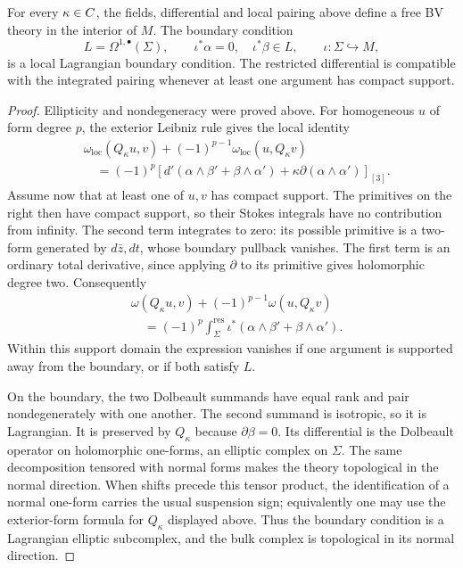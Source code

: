 \begin{proposition}
\label{prop:bf-bv-family}
For every $\kappa\in C$, the fields, differential and local pairing above
define a free BV theory in the interior of $M$.  The boundary condition
\[
 L=\Omega^{1,\bullet}(\Sigma),\qquad
 \iota^*\alpha=0,\quad \iota^*\beta\in L,
 \qquad \iota:\Sigma\hookrightarrow M,
\]
is a local Lagrangian boundary condition.  The restricted differential
is compatible with the integrated pairing whenever at least one
argument has compact support.
\end{proposition}
\begin{proof}
Ellipticity and nondegeneracy were proved above.  For homogeneous $u$
of form degree $p$, the exterior Leibniz rule gives the local identity
\[
 \begin{split}
 &\omega_{\mathrm{loc}}(Q_\kappa u,v)
              +(-1)^{p-1}\omega_{\mathrm{loc}}(u,Q_\kappa v)\\
 &\quad=(-1)^p\left[d'(\alpha\wedge\beta'+\beta\wedge\alpha')
                  +\kappa\partial(\alpha\wedge\alpha')\right]_{[3]}.
 \end{split}
\]
Assume now that at least one of $u,v$ has compact support.  The
primitives on the right then have compact support, so their Stokes
integrals have no contribution from infinity.  The second term
integrates to zero: its possible primitive is a two-form generated
by $d\bar z,dt$, whose boundary pullback vanishes.  The first term is
an ordinary total derivative, since applying $\partial$ to its
primitive gives holomorphic degree two.  Consequently
\[
 \begin{split}
 &\omega(Q_\kappa u,v)+(-1)^{p-1}\omega(u,Q_\kappa v)\\
 &\quad=(-1)^p\int_\Sigma^{\mathrm{res}}
    \iota^*(\alpha\wedge\beta'+\beta\wedge\alpha').
 \end{split}
\]
Within this support domain the expression vanishes if one argument
is supported away from the boundary, or if both satisfy $L$.

On the boundary, the two Dolbeault summands have equal rank and pair
nondegenerately with one another.  The second summand is isotropic,
so it is Lagrangian.  It is preserved by $Q_\kappa$ because
$\partial\beta=0$.  Its differential is the Dolbeault operator on
holomorphic one-forms, an elliptic complex on $\Sigma$.
The same decomposition tensored with normal forms makes the theory
topological in the normal direction.  When shifts precede this tensor
product, the identification of a normal one-form carries the usual
suspension sign; equivalently one may use the exterior-form formula
for $Q_\kappa$ displayed above.  Thus the boundary condition is a Lagrangian elliptic subcomplex,
and the bulk complex is topological in its normal direction.
\end{proof}

